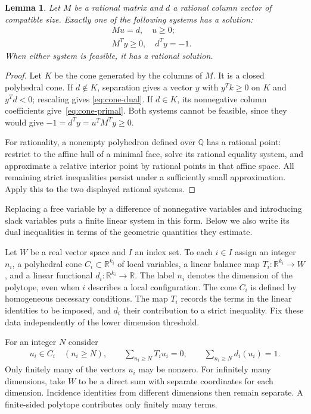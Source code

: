 \documentclass[11pt]{article}
\newtheorem{lemma}[theorem]{Lemma}
\theoremstyle{definition}
\theoremstyle{remark}
\numberwithin{equation}{section}
\newcommand{\R}{\mathbb R}
\newcommand{\Q}{\mathbb Q}
\begin{document}
\begin{lemma}\label{lem:cone-alternative}
Let $M$ be a rational matrix and $d$ a rational column vector of
compatible size. Exactly one of the following
systems has a solution:
\begin{align}
 Mu=d,\quad u\ge0; &\label{eq:cone-primal}\\
 M^Ty\ge0,\quad d^Ty=-1. &\label{eq:cone-dual}
\end{align}
When either system is feasible, it has a rational solution.
\end{lemma}
\begin{proof}
Let $K$ be the cone generated by the columns of $M$. It is a closed
polyhedral cone. If $d\notin K$, separation gives a vector $y$ with
$y^Tk\ge0$ on $K$ and $y^Td<0$; rescaling gives
\eqref{eq:cone-dual}. If $d\in K$, its nonnegative column
coefficients give~\eqref{eq:cone-primal}. Both systems cannot be
feasible, since they would give
$-1=d^Ty=u^TM^Ty\ge0$.

For rationality, a nonempty polyhedron defined over $\Q$ has a
rational point: restrict to the affine hull of a minimal face,
solve its rational equality system, and approximate a relative
interior point by rational points in that affine space. All remaining
strict inequalities persist under a sufficiently small approximation.
Apply this to the two displayed rational systems.
\end{proof}

Replacing a free variable by a difference of nonnegative variables
and introducing slack variables puts a finite linear system in this
form. Below we also write its dual inequalities in terms of the
geometric quantities they estimate.

Let $W$ be a real vector space and $I$ an index set. To each $i\in I$
assign an integer $n_i$, a polyhedral cone $C_i\subset\R^{k_i}$ of local variables,
a linear balance map $T_i:\R^{k_i}\longrightarrow W$, and a linear
functional $d_i:\R^{k_i}\longrightarrow\R$. The label $n_i$ denotes
the dimension of the polytope, even when $i$ describes a local
configuration. The cone $C_i$ is defined by homogeneous necessary
conditions. The
map $T_i$ records the terms in the linear identities to be imposed,
and $d_i$ their contribution to a strict inequality. Fix these data
independently of the lower dimension threshold.

For an integer $N$ consider
\begin{equation}\label{eq:common-feasibility}
 \begin{gathered}
 u_i\in C_i\quad(n_i\ge N),\qquad
 \sum_{n_i\ge N}T_i u_i=0,\qquad
 \sum_{n_i\ge N}d_i(u_i)=1.
 \end{gathered}
\end{equation}
Only finitely many of the vectors $u_i$ may be nonzero. For infinitely many
dimensions, take $W$ to be a direct sum with separate coordinates for
each dimension. Incidence identities from different dimensions then
remain separate. A finite-sided polytope contributes only finitely
many terms.
\end{document}
